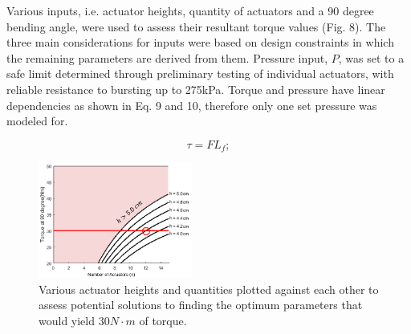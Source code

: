 \documentclass[letterpaper, 10 pt, conference]{ieeeconf}  %
\begin{document}
Various inputs, i.e. actuator heights, quantity of actuators and a 90 degree bending angle, were used to assess their resultant torque values (Fig. 8). The three main considerations for inputs were based on design constraints in which the remaining parameters are derived from them. Pressure input, $P$,  was set to a safe limit determined through preliminary testing of individual actuators, with reliable resistance to bursting up to 275kPa. Torque and pressure have linear dependencies as shown in Eq.  9 and 10, therefore only one set pressure was modeled for. 


\begin{equation}\label{eq. X16}
	\tau = FL_f ; 
\end{equation}

\begin{figure}[t!]
\centering
\includegraphics[width=0.45\textwidth]{dif_R_n.PNG}
\caption{Various actuator heights and quantities plotted against each other to assess potential solutions to finding the optimum parameters that would yield 30$N \cdot m$ of torque.}
\vspace{-1.5em}
\label{fig:dif_R_n}

\end{figure}





\end{document}
